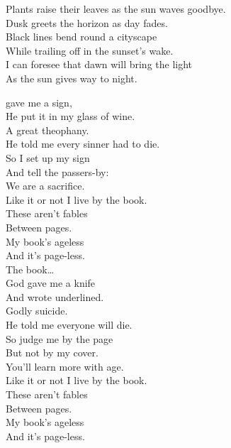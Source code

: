 Plants raise their leaves as the sun waves goodbye. \\
Dusk greets the horizon as day fades. \\
Black lines bend round a cityscape \\
While trailing off in the sunset's wake. \\
I can foresee that dawn will bring the light \\
As the sun gives way to night. \\





 gave me a sign, \\
He put it in my glass of wine. \\
A great theophany. \\
He told me every sinner had to die. \\
So I set up my sign \\
And tell the passers-by: \\
We are a sacrifice. \\
Like it or not I live by the book. \\

These aren't fables \\
Between pages. \\
My book's ageless \\
And it's page-less. \\

The book… \\

God gave me a knife \\
And wrote  underlined. \\
Godly suicide. \\
He told me everyone will die. \\
So judge me by the page \\
But not by my cover. \\
You'll learn more with age. \\
Like it or not I live by the book. \\

These aren't fables \\
Between pages. \\
My book's ageless \\
And it's page-less. \\

